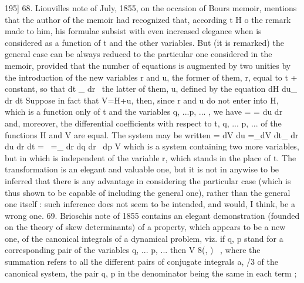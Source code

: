\documentclass[11pt,a4paper]{book}
\begin{document}

195]
68. Liouvilles note of July, 1855, on the occasion of Bours memoir, mentions
that the author of the memoir had recognized that, according t H o the remark made to
him, his formulae subsist with even increased elegance when is considered as a
function of t and the other variables. But (it is remarked) the general case can be
always reduced to the particular one considered in the memoir, provided that the
number of equations is augmented by two unities by the introduction of the new
variables r and u, the former of them, r, equal to t + constant, so that
dt _
dr~
the latter of them, u, defined by the equation
dH
du_
dr dt
Suppose in fact that
V=H+u,
then, since r and u do not enter into H, which is a function only of t and the
variables q, ...p, ... , we have
= =
du dr
and, moreover, the differential coefficients with respect to t, q, ... p, ... of the functions
H and V are equal. The system may be written
= dV du =_dV
dt_
dr du dr dt
=~ =_
dr dq dr~ dp
V
which is a system containing two more variables, but in which is independent of
the variable r, which stands in the place of t. The transformation is an elegant and
valuable one, but it is not in anywise to be inferred that there is any advantage in
considering the particular case (which is thus shown to be capable of including the
general one), rather than the general one itself : such inference does not seem to be
intended, and would, I think, be a wrong one.
69. Brioschis note of 1855 contains an elegant demonstration (founded on the
theory of skew determinants) of a property, which appears to be a new one, of the
canonical integrals of a dynamical problem, viz. if q, p stand for a corresponding pair
of the variables q, ... p, ... then
V 8(, )~ ,
where the summation refers to all the different pairs of conjugate integrals a, /3 of
the canonical system, the pair q, p in the denominator being the same in each term ;


\end{document}
